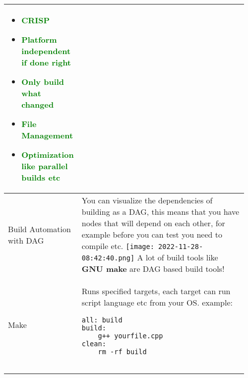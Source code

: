 \documentclass[main.tex,fontsize=8pt,paper=a4,paper=portrait,DIV=calc,]{scrartcl}
\begin{document}
\begin{table}[ht!]
\begin{tabular}{|m{0.2\linewidth}|m{0.755\linewidth}|}
\begin{itemize}
  \item \textcolor{green}{CRISP}
\item \textcolor{green}{Platform independent if done right}
\item \textcolor{green}{Only build what changed}
\item \textcolor{green}{File Management}
\item \textcolor{green}{Optimization like parallel builds etc}
\vspace{-3mm}
\end{itemize}\\
\hline
Build Automation with DAG & 
You can visualize the dependencies of building as a DAG, this means that you have nodes that will depend on each other, for example before you can test you need to compile etc.\newline
\texttt{[image: 2022-11-28-08:42:40.png]}\newline 
A lot of build tools like \textbf{GNU make} are DAG based build tools!\\
\hline
Make & 
Runs specified targets, each target can run script language etc from your OS.\newline
example:\newline
\begin{lstlisting}
all: build
build: 
    g++ yourfile.cpp
clean: 
    rm -rf build


\end{lstlisting}
\end{tabular}
\end{table}
\end{document}
